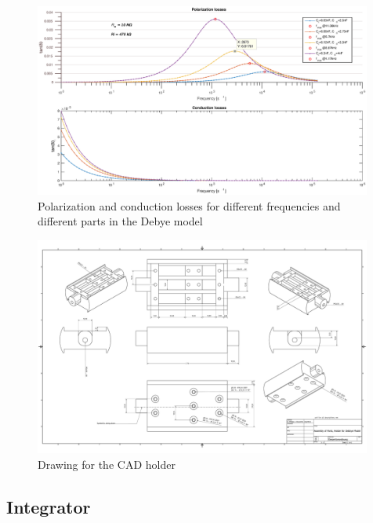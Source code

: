 \begin{figure}
\includegraphics[width=0.99\textwidth]{figures/Method/Dielectric_loss/polarizationmultiple.eps}
    \caption{Polarization and conduction losses for different frequencies and different parts in the Debye model}
    \label{fig.debye-modell}
   \end{figure}

   
   \begin{figure}
\includegraphics[width=0.99\textwidth]{figures/Gesamtanordnung.pdf}
    \caption{Drawing for the CAD holder}
    \label{fig.CADdrawing}
   \end{figure}

\subsection{Integrator}
